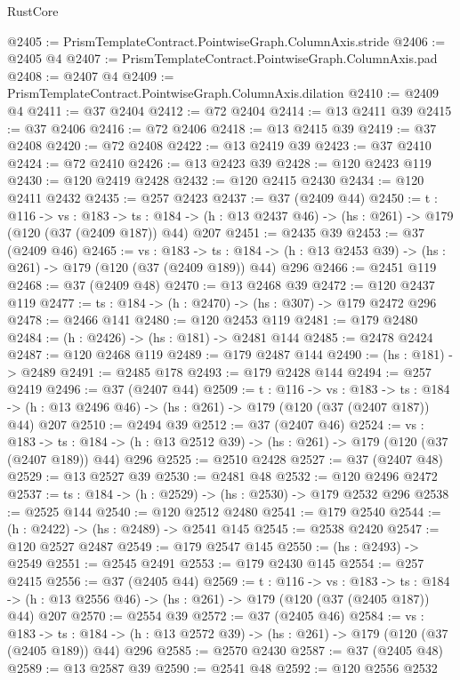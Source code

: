 \begin{lexlean}{RustCore}
\begin{coremodule}
@2405 := PrismTemplateContract.PointwiseGraph.ColumnAxis.stride
@2406 := @2405 @4
@2407 := PrismTemplateContract.PointwiseGraph.ColumnAxis.pad
@2408 := @2407 @4
@2409 := PrismTemplateContract.PointwiseGraph.ColumnAxis.dilation
@2410 := @2409 @4
@2411 := @37 @2404
@2412 := @72 @2404
@2414 := @13 @2411 @39
@2415 := @37 @2406
@2416 := @72 @2406
@2418 := @13 @2415 @39
@2419 := @37 @2408
@2420 := @72 @2408
@2422 := @13 @2419 @39
@2423 := @37 @2410
@2424 := @72 @2410
@2426 := @13 @2423 @39
@2428 := @120 @2423 @119
@2430 := @120 @2419 @2428
@2432 := @120 @2415 @2430
@2434 := @120 @2411 @2432
@2435 := @257 @2423
@2437 := @37 (@2409 @44)
@2450 := {t : @116} ->
  {vs : @183} ->
  {ts : @184} -> (h : @13 @2437 @46) -> (hs : @261) -> @179 (@120 (@37 (@2409 @187)) @44) @207
@2451 := @2435 @39
@2453 := @37 (@2409 @46)
@2465 := {vs : @183} ->
  {ts : @184} -> (h : @13 @2453 @39) -> (hs : @261) -> @179 (@120 (@37 (@2409 @189)) @44) @296
@2466 := @2451 @119
@2468 := @37 (@2409 @48)
@2470 := @13 @2468 @39
@2472 := @120 @2437 @119
@2477 := {ts : @184} -> (h : @2470) -> (hs : @307) -> @179 @2472 @296
@2478 := @2466 @141
@2480 := @120 @2453 @119
@2481 := @179 @2480
@2484 := (h : @2426) -> (hs : @181) -> @2481 @144
@2485 := @2478 @2424
@2487 := @120 @2468 @119
@2489 := @179 @2487 @144
@2490 := (hs : @181) -> @2489
@2491 := @2485 @178
@2493 := @179 @2428 @144
@2494 := @257 @2419
@2496 := @37 (@2407 @44)
@2509 := {t : @116} ->
  {vs : @183} ->
  {ts : @184} -> (h : @13 @2496 @46) -> (hs : @261) -> @179 (@120 (@37 (@2407 @187)) @44) @207
@2510 := @2494 @39
@2512 := @37 (@2407 @46)
@2524 := {vs : @183} ->
  {ts : @184} -> (h : @13 @2512 @39) -> (hs : @261) -> @179 (@120 (@37 (@2407 @189)) @44) @296
@2525 := @2510 @2428
@2527 := @37 (@2407 @48)
@2529 := @13 @2527 @39
@2530 := @2481 @48
@2532 := @120 @2496 @2472
@2537 := {ts : @184} -> (h : @2529) -> (hs : @2530) -> @179 @2532 @296
@2538 := @2525 @144
@2540 := @120 @2512 @2480
@2541 := @179 @2540
@2544 := (h : @2422) -> (hs : @2489) -> @2541 @145
@2545 := @2538 @2420
@2547 := @120 @2527 @2487
@2549 := @179 @2547 @145
@2550 := (hs : @2493) -> @2549
@2551 := @2545 @2491
@2553 := @179 @2430 @145
@2554 := @257 @2415
@2556 := @37 (@2405 @44)
@2569 := {t : @116} ->
  {vs : @183} ->
  {ts : @184} -> (h : @13 @2556 @46) -> (hs : @261) -> @179 (@120 (@37 (@2405 @187)) @44) @207
@2570 := @2554 @39
@2572 := @37 (@2405 @46)
@2584 := {vs : @183} ->
  {ts : @184} -> (h : @13 @2572 @39) -> (hs : @261) -> @179 (@120 (@37 (@2405 @189)) @44) @296
@2585 := @2570 @2430
@2587 := @37 (@2405 @48)
@2589 := @13 @2587 @39
@2590 := @2541 @48
@2592 := @120 @2556 @2532

\end{coremodule}
\end{lexlean}
